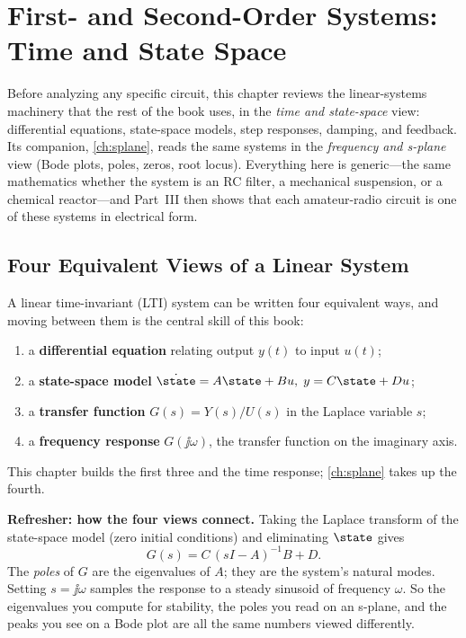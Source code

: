 \chapter{First- and Second-Order Systems: Time and State Space}
\label{ch:linsys}
Before analyzing any specific circuit, this chapter reviews the linear-systems
machinery that the rest of the book uses, in the \emph{time and state-space} view:
differential equations, state-space models, step responses, damping, and
feedback. Its companion, \cref{ch:splane}, reads the same systems in the
\emph{frequency and s-plane} view (Bode plots, poles, zeros, root locus).
Everything here is generic---the same mathematics whether the system is an RC
filter, a mechanical suspension, or a chemical reactor---and Part~III then shows
that each amateur-radio circuit is one of these systems in electrical form.

\section{Four Equivalent Views of a Linear System}
A linear time-invariant (LTI) system can be written four equivalent ways, and moving
between them is the central skill of this book:
\begin{enumerate}
\item a \textbf{differential equation} relating output \(y(t)\) to input \(u(t)\);
\item a \textbf{state-space model} \(\dot{\state}=A\state+Bu,\; y=C\state+Du\);
\item a \textbf{transfer function} \(G(s)=Y(s)/U(s)\) in the Laplace variable
\(s\);
\item a \textbf{frequency response} \(G(\jj\omega)\), the transfer function on the
imaginary axis.
\end{enumerate}
This chapter builds the first three and the time response; \cref{ch:splane} takes
up the fourth.

\begin{controlsbox}
\textbf{Refresher: how the four views connect.} Taking the Laplace transform of
the state-space model (zero initial conditions) and eliminating \(\state\) gives
\[
G(s)=C\,(sI-A)^{-1}B+D .
\]
The \emph{poles} of \(G\) are the eigenvalues of \(A\); they are the system's
natural modes. Setting \(s=\jj\omega\) samples the response to a steady sinusoid
of frequency \(\omega\). So the eigenvalues you compute for stability, the poles
you read on an s-plane, and the peaks you see on a Bode plot are all the same
numbers viewed differently.
\end{controlsbox}

